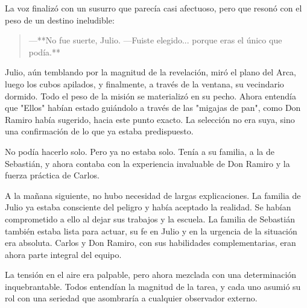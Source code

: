 \documentclass[a4paper,12pt]{book}
\begin{document}
La voz finalizó con un susurro que parecía casi afectuoso, pero que resonó con el peso de un destino ineludible:

\begin{quote}
    —**No fue suerte, Julio. —Fuiste elegido... porque eras el único que podía.**
\end{quote}

Julio, aún temblando por la magnitud de la revelación, miró el plano del Arca, luego los cubos apilados, y finalmente, a través de la ventana, su vecindario dormido. Todo el peso de la misión se materializó en su pecho. Ahora entendía que "Ellos" habían estado guiándolo a través de las "migajas de pan", como Don Ramiro había sugerido, hacia este punto exacto. La selección no era suya, sino una confirmación de lo que ya estaba predispuesto.

No podía hacerlo solo. Pero ya no estaba solo. Tenía a su familia, a la de Sebastián, y ahora contaba con la experiencia invaluable de Don Ramiro y la fuerza práctica de Carlos.

A la mañana siguiente, no hubo necesidad de largas explicaciones. La familia de Julio ya estaba consciente del peligro y había aceptado la realidad. Se habían comprometido a ello al dejar sus trabajos y la escuela. La familia de Sebastián también estaba lista para actuar, su fe en Julio y en la urgencia de la situación era absoluta. Carlos y Don Ramiro, con sus habilidades complementarias, eran ahora parte integral del equipo.

La tensión en el aire era palpable, pero ahora mezclada con una determinación inquebrantable. Todos entendían la magnitud de la tarea, y cada uno asumió su rol con una seriedad que asombraría a cualquier observador externo.
\end{document}
